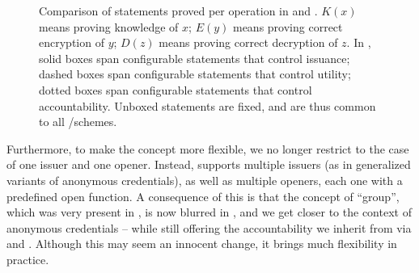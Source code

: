 \begin{figure}[ht!]
  
  \caption{Comparison of statements proved per operation in \GSAC and \UAS.
    $K(x)$ means proving knowledge of $x$; $E(y)$ means proving correct
    encryption of $y$; $D(z)$ means proving correct decryption of $z$. In
    \UAS, solid boxes span configurable statements that control issuance; dashed
    boxes span configurable statements that control utility; dotted boxes span
    configurable statements that control accountability. Unboxed statements are
    fixed, and are thus common to all \GSAC/\UAS schemes.}
  \label{fig:proof-blocks-uas}
\end{figure}

Furthermore, to make the concept more flexible, we no longer restrict to the
case of one issuer and one opener. Instead, \UAS supports multiple issuers (as
in generalized variants of anonymous credentials), as well as multiple openers,
each one with a predefined open function. 
A consequence of this is that the concept of ``group'', which was very present
in \GSAC, is now blurred in \UAS, and we get closer to the context of anonymous
credentials -- while still offering the accountability we inherit from \GSAC
via \Open and \Judge.
%
Although this may seem an innocent change, it brings much flexibility in
practice.






